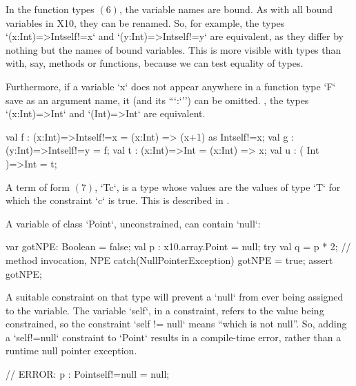 In the function types {$(6)$}, the variable names are bound.  As with all
bound variables in X10, they can be renamed. So, for example,
the types \xcd`(x:Int)=>Int{self!=x}` and \xcd`(y:Int)=>Int{self!=y}` are
equivalent, as they differ by nothing but the names of bound variables. 
This is more visible with types
than with, say, methods or functions, because we can test equality of types.

Furthermore, if a variable \xcd`x` does not appear anywhere in a function type
\xcd`F` save as an argument name, it (and its ``\xcd`:`'') can be omitted.
\Eg, the types 
\xcd`(x:Int)=>Int`
and 
\xcd`(Int)=>Int`
are equivalent.

\begin{ex}
\begin{xten}
val f : (x:Int)=>Int{self!=x} = (x:Int) => (x+1) as Int{self!=x}; 
val g : (y:Int)=>Int{self!=y} = f;
val t : (x:Int)=>Int          = (x:Int) => x;
val u : ( Int )=>Int          = t;
\end{xten}
\end{ex}


A term of form {$(7)$}, \xcd`T{c}`, is a type whose values are the values of
type \xcd`T` for which the constraint \xcd`c` is true.  This is described in
. 

\begin{ex}
A variable of class \xcd`Point`, unconstrained, can contain \xcd`null`: 
\begin{xten}
var gotNPE: Boolean = false;
val p : x10.array.Point = null; 
try {
  val q = p * 2; // method invocation, NPE
}
catch(NullPointerException) {
  gotNPE = true;
}
assert gotNPE;
\end{xten}

A suitable constraint on that type will prevent a \xcd`null` from ever being
assigned to the variable.  The variable \xcd`self`, in a constraint, refers to
the value being constrained, so the constraint \xcd`self != null` means
``which is not null''.  So, adding a \xcd`{self!=null}` constraint to 
\xcd`Point` results in a compile-time error, rather than a runtime null
pointer exception.  
\begin{xten}
// ERROR: p : Point{self!=null} = null;
\end{xten}
\end{ex}


